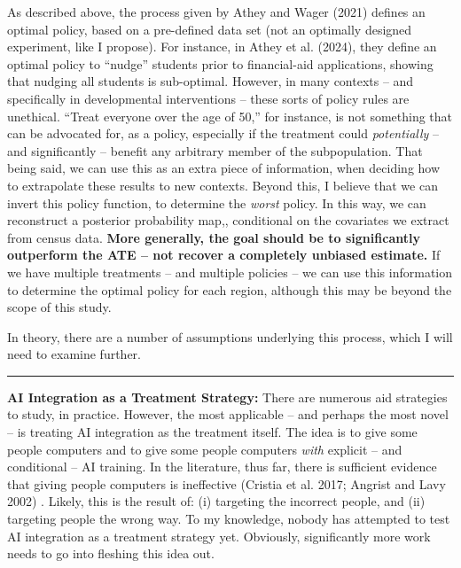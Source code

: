 \documentclass[12pt,letterpaper,doublespace, oneside]{article}
\begin{document}
As described above, the process given by Athey and Wager (2021) \cite{Athey2021} defines an optimal policy, based on a pre-defined data set (not an optimally designed experiment, like I propose). For instance, in Athey et al. (2024), they define an optimal policy to \enquote{nudge} students prior to financial-aid applications, showing that nudging all students is sub-optimal. However, in many contexts -- and specifically in developmental interventions -- these sorts of policy rules are unethical. \enquote{Treat everyone over the age of 50,} for instance, is not something that can be advocated for, as a policy, especially if the treatment could \emph{potentially} -- and significantly -- benefit any arbitrary member of the subpopulation. That being said, we can use this as an extra piece of information, when deciding how to extrapolate these results to new contexts. Beyond this, I believe that we can invert this policy function, to determine the \emph{worst} policy. In this way, we can reconstruct a  posterior probability map,, conditional on the covariates we extract from census data. \textbf{More generally, the goal should be to significantly outperform the ATE -- not recover a completely unbiased estimate.} If we have multiple treatments -- and multiple policies -- we can use this information to determine the optimal policy for each region, although this may be beyond the scope of this study. 

In theory, there are a number of assumptions underlying this process, which I will need to examine further. 

\noindent\rule{\linewidth}{0.4pt}

\noindent\textbf{AI Integration as a Treatment Strategy:} 
There are numerous aid strategies to study, in practice. However, the most applicable -- and perhaps the most novel -- is treating AI integration as the treatment itself. The idea is to give some people computers and to give some people computers \emph{with} explicit -- and conditional -- AI training. In the literature, thus far, there is sufficient evidence that giving people computers is ineffective (Cristia et al. 2017; Angrist and Lavy 2002) \cite{Cristia2017} \cite{Angrist2002}. Likely, this is the result of: (i) targeting the incorrect people, and (ii) targeting people the wrong way. To my knowledge, nobody has attempted to test AI integration as a treatment strategy yet. Obviously, significantly more work needs to go into fleshing this idea out.



\end{document}
